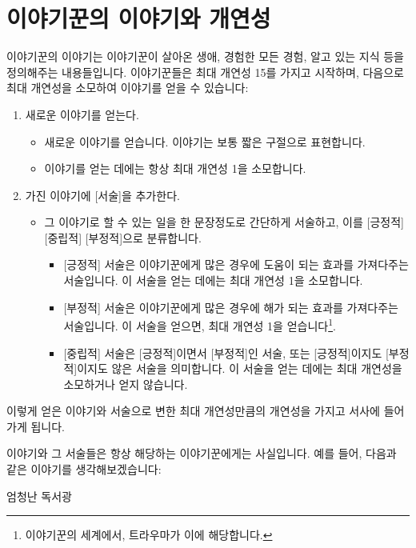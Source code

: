 \documentclass{report}
\begin{document}
	\section*{이야기꾼의 이야기와 개연성}
	이야기꾼의 이야기는 이야기꾼이 살아온 생애, 경험한 모든 경험, 알고 있는 지식 등을 정의해주는 내용들입니다. 이야기꾼들은 최대 개연성 15를 가지고 시작하며, 다음으로 최대 개연성을 소모하여 이야기를 얻을 수 있습니다:
	\begin{enumerate}
		\item 새로운 이야기를 얻는다.
			\begin{itemize}
				\item 새로운 이야기를 얻습니다. 이야기는 보통 짧은 구절으로 표현합니다.
				
				\item 이야기를 얻는 데에는 항상 최대 개연성 1을 소모합니다.
			\end{itemize}
		
		\item 가진 이야기에 [서술]을 추가한다.
			\begin{itemize}
				\item 그 이야기로 할 수 있는 일을 한 문장정도로 간단하게 서술하고, 이를 [긍정적] [중립적] [부정적]으로 분류합니다.
					\begin{itemize}
						\item{} [긍정적] 서술은 이야기꾼에게 많은 경우에 도움이 되는 효과를 가져다주는 서술입니다. 이 서술을 얻는 데에는 최대 개연성 1을 소모합니다.
						\item{} [부정적] 서술은 이야기꾼에게 많은 경우에 해가 되는 효과를 가져다주는 서술입니다. 이 서술을 얻으면, 최대 개연성 1을 얻습니다\footnote{이야기꾼의 세계에서, 트라우마가 이에 해당합니다.}.
						\item{} [중립적] 서술은 [긍정적]이면서 [부정적]인 서술, 또는 [긍정적]이지도 [부정적]이지도 않은 서술을 의미합니다. 이 서술을 얻는 데에는 최대 개연성을 소모하거나 얻지 않습니다.
					\end{itemize}
			\end{itemize}
	\end{enumerate}
	이렇게 얻은 이야기와 서술으로 변한 최대 개연성만큼의 개연성을 가지고 서사에 들어가게 됩니다.
	
	이야기와 그 서술들은 항상 해당하는 이야기꾼에게는 사실입니다. 예를 들어, 다음과 같은 이야기를 생각해보겠습니다:
	
	\begin{lite}{엄청난 독서광}
		
		
	\end{lite}
	
\end{document}
